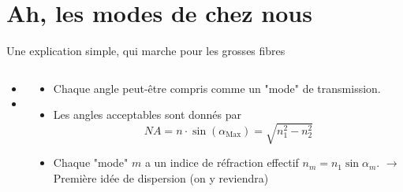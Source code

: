 \documentclass[aspectratio=149, 10pt, t]{beamer}
\begin{document}
\section{Ah, les modes de chez nous}

\begin{frame}{Une explication simple, qui marche pour les grosses fibres}
    \begin{columns}
    \begin{column}{0.5\linewidth}
            \begin{itemize}
                \item {}
                \item {}
            \end{itemize}
    \end{column}
    \begin{column}{0.5\linewidth}
        \begin{itemize}
            \item Chaque angle peut-être compris comme un "mode" de transmission.
            \item Les angles acceptables sont donnés par
            \begin{equation}
    N A=n \cdot \sin \left(\alpha_{\operatorname{Max}}\right)=\sqrt{n_{1}^{2}-n_{2}^{2}}
    \end{equation}
            \item Chaque "mode" $m$ a un indice de réfraction effectif $n_m=n_1\sin\alpha_m$. $\longrightarrow$ Première idée de dispersion (on y reviendra)
        \end{itemize}
    \end{column}
    \end{columns}
\end{frame}
\end{document}
